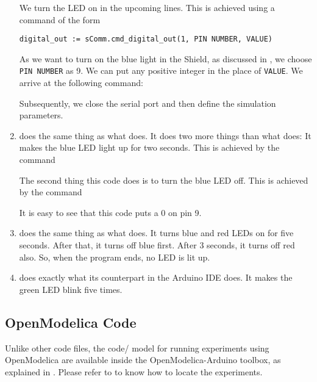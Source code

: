 \begin{enumerate}
        We turn the LED on in the upcoming lines.  This is achieved using a
        command of the form
        \begin{lstlisting}[style=nonumbers]
          digital_out := sComm.cmd_digital_out(1, PIN NUMBER, VALUE)
  \end{lstlisting}
        As we want to turn on the blue light in the Shield, as discussed in
        , we choose {\tt PIN NUMBER} as 9.  We can put
        any positive integer in the place of {\tt VALUE}.  We arrive at the
        following command:
        
        Subsequently, we close the serial port and then define the simulation parameters. 
  \item {} does the same thing as what
         does.  It does two more things than what
         does: It makes the blue LED light up for two
        seconds.  This is achieved by the command
        
        The second thing this code does is to turn the blue LED off.  This
        is achieved by the command
        
        It is easy to see that this code puts a 0 on pin 9.
        
  \item {} does the same thing as what
         does.  It turns blue and red LEDs on for
        five seconds.  After that, it turns off blue first.  After 3
        seconds, it turns off red also.  So, when the program ends, no LED is
        lit up.
        
  \item {} does exactly what its counterpart
        in the Arduino IDE does.  It makes the green LED blink five times.
  \end{enumerate}

\subsection{OpenModelica Code}
Unlike other code files, the code/ model for running experiments using OpenModelica are 
available inside the OpenModelica-Arduino toolbox, as explained in .
Please refer to  to know how to locate the experiments. 
\lstset{style=mystyle}
\label{sec:led-OpenModelica-code}

